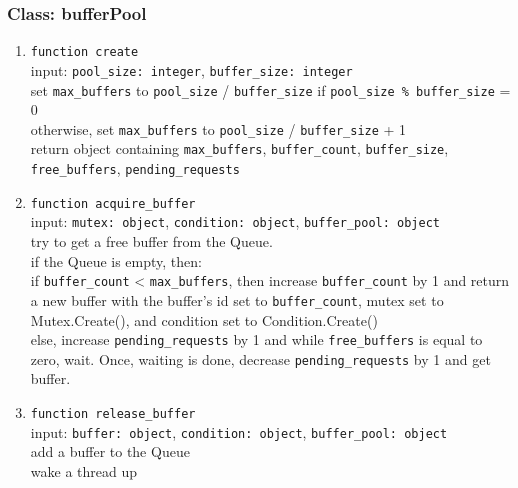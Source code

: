 \subsubsection{Class: bufferPool}
\begin{enumerate}
    \item \verb|function create| \\
    input: \verb|pool_size: integer|, \verb|buffer_size: integer| \\
    set \verb|max_buffers| to \verb|pool_size| / \verb|buffer_size| if \verb|pool_size % buffer_size| = 0 \\
    otherwise, set \verb|max_buffers| to \verb|pool_size| / \verb|buffer_size| + 1 \\
    return object containing \verb|max_buffers|, \verb|buffer_count|, \verb|buffer_size|, \verb|free_buffers|, \verb|pending_requests| \\
    \item \verb|function acquire_buffer| \\
    input: \verb|mutex: object|, \verb|condition: object|, \verb|buffer_pool: object| \\
    try to get a free buffer from the Queue. \\
    if the Queue is empty, then: \\
    if \verb|buffer_count| < \verb|max_buffers|, then increase \verb|buffer_count| by 1 and return a new buffer with the buffer's id set to \verb|buffer_count|, mutex set to Mutex.Create(), and condition set to Condition.Create() \\
    else, increase \verb|pending_requests| by 1 and while \verb|free_buffers| is equal to zero, wait. Once, waiting is done, decrease \verb|pending_requests| by 1 and get buffer. \\
    \item \verb|function release_buffer| \\
    input: \verb|buffer: object|, \verb|condition: object|, \verb|buffer_pool: object| \\
    add a buffer to the Queue \\
    wake a thread up
\end{enumerate}
